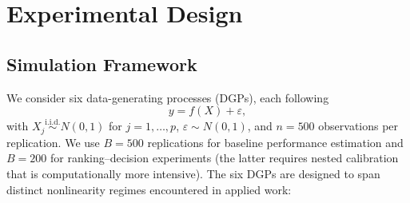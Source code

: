 \documentclass[pdflatex,sn-mathphys-ay]{sn-jnl}%
\theoremstyle{thmstyleone}%
\theoremstyle{thmstyletwo}%
\theoremstyle{thmstylethree}%
\begin{document}
\section{Experimental Design}
\label{sec:design}

\subsection{Simulation Framework}

We consider six data-generating processes (DGPs), each following
\begin{equation}
    y = f(X) + \varepsilon,
\end{equation}
with $X_j \stackrel{\text{i.i.d.}}{\sim} N(0,1)$ for $j=1,\ldots,p$, $\varepsilon \sim N(0,1)$, and $n = 500$ observations per replication. We use $B = 500$ replications for baseline performance estimation and $B = 200$ for ranking--decision experiments (the latter requires nested calibration that is computationally more intensive). The six DGPs are designed to span distinct nonlinearity regimes encountered in applied work:
\end{document}
